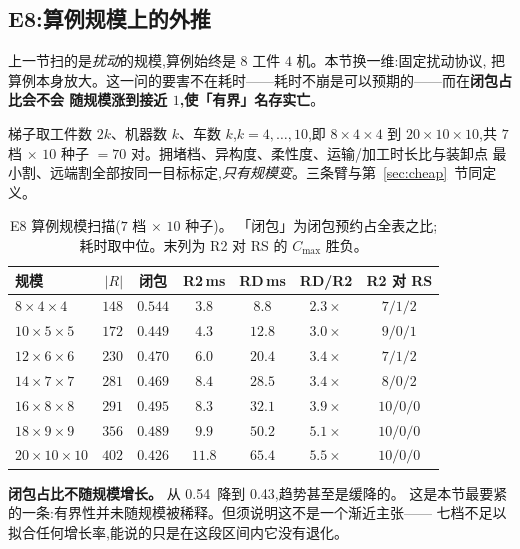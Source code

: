 \documentclass[manuscript,screen,review]{acmart}
\newcommand{\NSeeds}{10}
\newcommand{\ScaleKs}{7}
\newcommand{\ScalePairs}{70}
\newcommand{\ScaleJobsHi}{20}
\newcommand{\ScaleMachHi}{10}
\newcommand{\ScaleCloLo}{0.43}       %
\newcommand{\ScaleCloHi}{0.54}       %
\begin{document}
\subsection{E8:算例规模上的外推}
\label{sec:instscale}

上一节扫的是\emph{扰动}的规模,算例始终是 \(8\) 工件 \(4\) 机。本节换一维:固定扰动协议,
把算例本身放大。这一问的要害不在耗时——耗时不崩是可以预期的——而在\textbf{闭包占比会不会
随规模涨到接近 \(1\),使「有界」名存实亡}。

梯子取工件数 \(2k\)、机器数 \(k\)、车数 \(k\),\(k=4,\dots,10\),即 \(8\times4\times4\) 到
\(\ScaleJobsHi\times\ScaleMachHi\times\ScaleMachHi\),共 \(\ScaleKs\) 档 \(\times\)
\(\NSeeds\) 种子 \(=\ScalePairs\) 对。拥堵档、异构度、柔性度、运输/加工时长比与装卸点
最小割、远端割全部按同一目标标定,\emph{只有规模变}。三条臂与第~\ref{sec:cheap}~节同定义。

\begin{table}[t]
\centering
\caption{E8 算例规模扫描(\(\ScaleKs\) 档 \(\times\) \(\NSeeds\) 种子)。
「闭包」为闭包预约占全表之比;耗时取中位。末列为 R2 对 RS 的 \(C_{\max}\) 胜负。}
\label{tab:instscale}
\small
\begin{tabular}{@{}lrccccc@{}}
\toprule
规模 & \(|R|\) & 闭包 & R2\,ms & RD\,ms & RD/R2 & R2 对 RS \\
\midrule
\(8\times4\times4\)    & \(148\) & \(0.544\) & \(3.8\)  & \(8.8\)  & \(2.3\times\) & \(7/1/2\) \\
\(10\times5\times5\)   & \(172\) & \(0.449\) & \(4.3\)  & \(12.8\) & \(3.0\times\) & \(9/0/1\) \\
\(12\times6\times6\)   & \(230\) & \(0.470\) & \(6.0\)  & \(20.4\) & \(3.4\times\) & \(7/1/2\) \\
\(14\times7\times7\)   & \(281\) & \(0.469\) & \(8.4\)  & \(28.5\) & \(3.4\times\) & \(8/0/2\) \\
\(16\times8\times8\)   & \(291\) & \(0.495\) & \(8.3\)  & \(32.1\) & \(3.9\times\) & \(10/0/0\) \\
\(18\times9\times9\)   & \(356\) & \(0.489\) & \(9.9\)  & \(50.2\) & \(5.1\times\) & \(10/0/0\) \\
\(20\times10\times10\) & \(402\) & \(0.426\) & \(11.8\) & \(65.4\) & \(5.5\times\) & \(10/0/0\) \\
\bottomrule
\end{tabular}
\end{table}

\textbf{闭包占比不随规模增长。} 从 \ScaleCloHi\ 降到 \ScaleCloLo,趋势甚至是缓降的。
这是本节最要紧的一条:有界性并未随规模被稀释。但须说明这不是一个渐近主张——
七档不足以拟合任何增长率,能说的只是在这段区间内它没有退化。
\end{document}

